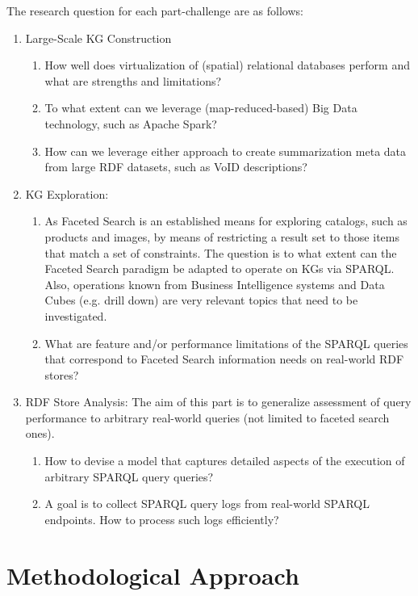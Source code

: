The research question for each part-challenge are as follows:

\begin{enumerate}
\item Large-Scale KG Construction
  \begin{enumerate}
    \item How well does virtualization of (spatial) relational databases perform and what are strengths and limitations?
    \item To what extent can we leverage (map-reduced-based) Big Data technology, such as Apache Spark?
    \item How can we leverage either approach to create summarization meta data from large RDF datasets, such as VoID descriptions?
  \end{enumerate}
\item KG Exploration:
  \begin{enumerate}
  \item As Faceted Search is an established means for exploring catalogs, such as products and images, by means of restricting a result set to those items that match a set of constraints. The question is to what extent can the Faceted Search paradigm be adapted to operate on KGs via SPARQL.  Also, operations known from Business Intelligence systems and Data Cubes (e.g. drill down) are very relevant topics that need to be investigated.
  \item What are feature and/or performance limitations of the SPARQL queries that correspond to Faceted Search information needs on real-world RDF stores?
  \end{enumerate}
\item RDF Store Analysis: The aim of this part is to generalize assessment of query performance to arbitrary real-world queries (not limited to faceted search ones).
  \begin{enumerate}
  \item How to devise a model that captures detailed aspects of the execution of arbitrary SPARQL query queries?
  \item A goal is to collect SPARQL query logs from real-world SPARQL endpoints. How to process such logs efficiently?
  \end{enumerate}
\end{enumerate}

\section{Methodological Approach}

